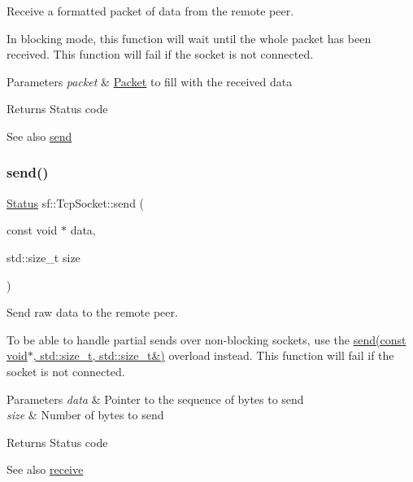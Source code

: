 Receive a formatted packet of data from the remote peer. 

In blocking mode, this function will wait until the whole packet has been received. This function will fail if the socket is not connected.


\begin{DoxyParams}{Parameters}
{\em packet} & \hyperlink{classsf_1_1_packet}{Packet} to fill with the received data\\
\hline
\end{DoxyParams}
\begin{DoxyReturn}{Returns}
Status code
\end{DoxyReturn}
\begin{DoxySeeAlso}{See also}
\hyperlink{classsf_1_1_tcp_socket_affce26ab3bcc4f5b9269dad79db544c0}{send} 
\end{DoxySeeAlso}
\mbox{\label{classsf_1_1_tcp_socket_affce26ab3bcc4f5b9269dad79db544c0}} 
\subsubsection{\texorpdfstring{send()}{send()}\hspace{0.1cm}{\footnotesize\ttfamily [1/3]}}
{\footnotesize\ttfamily \hyperlink{classsf_1_1_socket_a51bf0fd51057b98a10fbb866246176dc}{Status} sf\+::\+Tcp\+Socket\+::send (\begin{DoxyParamCaption}\item[{const void $\ast$}]{data,  }\item[{std\+::size\+\_\+t}]{size }\end{DoxyParamCaption})}



Send raw data to the remote peer. 

To be able to handle partial sends over non-\/blocking sockets, use the \hyperlink{classsf_1_1_tcp_socket_a31f5b280126a96c6f3ad430f4cbcb54d}{send(const void$\ast$, std\+::size\+\_\+t, std\+::size\+\_\+t\&)} overload instead. This function will fail if the socket is not connected.


\begin{DoxyParams}{Parameters}
{\em data} & Pointer to the sequence of bytes to send \\
\hline
{\em size} & Number of bytes to send\\
\hline
\end{DoxyParams}
\begin{DoxyReturn}{Returns}
Status code
\end{DoxyReturn}
\begin{DoxySeeAlso}{See also}
\hyperlink{classsf_1_1_tcp_socket_a90ce50811ea61d4f00efc62bb99ae1af}{receive} 
\end{DoxySeeAlso}
\mbox{\label{classsf_1_1_tcp_socket_a31f5b280126a96c6f3ad430f4cbcb54d}} 
